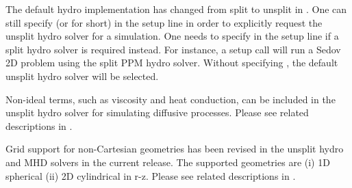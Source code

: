 \begin{flashtip}
The default hydro implementation has changed from split to unsplit in \flashx.
One can still specify  (or  for short) in the setup line in order to explicitly request the unsplit hydro solver for a simulation.
One needs to specify  in the setup line if  a split hydro solver is required instead.
For instance, a setup call  will run a Sedov 2D problem using the
split PPM hydro solver. Without specifying , the default unsplit hydro solver will be selected.
\end{flashtip}

\begin{flashtip}
Non-ideal terms, such as viscosity and heat conduction, can be included in the unsplit hydro solver
for simulating diffusive processes. Please see related descriptions in .
\end{flashtip}


\begin{flashtip}
Grid support for non-Cartesian geometries has been revised in the unsplit hydro and MHD solvers 
in the current release. The supported geometries are (i) 1D spherical (ii) 2D cylindrical in r-z. %
Please see related descriptions in .
\end{flashtip}


% 
% 


